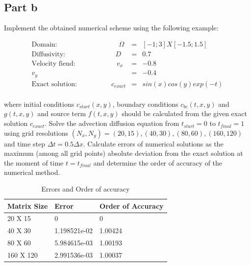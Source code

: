 \documentclass[12pt]{article}
\begin{document}
\newpage
\subsection{Part b}\label{sec::b}
Implement the obtained numerical scheme using the following example:

\begin{eqnarray}
\textrm{Domain:}\quad \quad \quad \quad \quad \quad \quad \quad \quad \Omega &=& [-1;3]X[-1.5;1.5]  \\\nonumber
\textrm{Diffusivity: } \quad \quad \quad\quad \quad \quad \quad D &=& 0.7\\\nonumber
\textrm{Velocity fiend:}\quad \quad \quad \quad \quad  \quad v_x&=& -0.8\\\nonumber
v_y&=&-0.4\\\nonumber
\textrm{Exact solution:}\quad \quad \quad \quad  \quad c_{exact}&=&sin(x)cos(y)exp(-t)\\\nonumber
\end{eqnarray}

where initial conditions $c_{start}(x,y)$, boundary conditions $c_{bc}(t,x,y)$ and $g(t,x,y)$ and source term $f(t,x,y)$ should be calculated from the given exact solution $c_{exact}$.  Solve the advection diffusion equation from $t_{start} = 0$ to $t_{final}=1$ using grid resolutions $(N_x, N_y) = (20,15), (40,30), (80,60), (160, 120)$ and time step $ \Delta t = 0.5 \Delta x$.  Calculate errors of numerical solutions  as the maximum (among all grid points) absolute deviation from the exact solution at the moment of time $t = t_{final}$ and determine the order of accuracy of the numerical method.

\begin{table}[bht]
\centering

\begin{tabular}{|l|l|l|}
\hline
Matrix Size & Error        & Order of Accuracy \\ \hline
20 X 15     & 0            & 0                 \\ \hline
40 X 30     & 1.198521e-02 & 1.00424           \\ \hline
80 X 60     & 5.984615e-03 & 1.00193           \\ \hline
160 X 120   & 2.991536e-03 & 1.00037           \\ \hline
\end{tabular}
\caption{Errors and Order of accuracy}
\label{Problem 2b}
\end{table}
\end{document}

